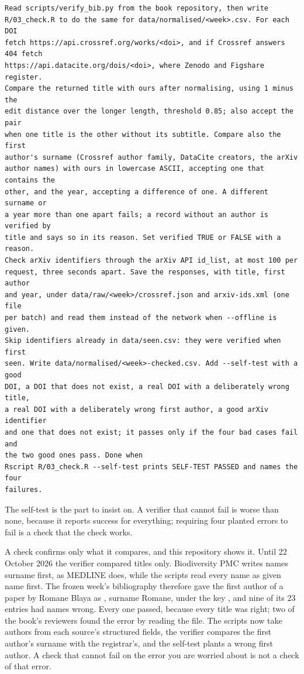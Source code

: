 \begin{lstlisting}[caption={The third prompt}]
Read scripts/verify_bib.py from the book repository, then write
R/03_check.R to do the same for data/normalised/<week>.csv. For each DOI
fetch https://api.crossref.org/works/<doi>, and if Crossref answers 404 fetch
https://api.datacite.org/dois/<doi>, where Zenodo and Figshare register.
Compare the returned title with ours after normalising, using 1 minus the
edit distance over the longer length, threshold 0.85; also accept the pair
when one title is the other without its subtitle. Compare also the first
author's surname (Crossref author family, DataCite creators, the arXiv
author names) with ours in lowercase ASCII, accepting one that contains the
other, and the year, accepting a difference of one. A different surname or
a year more than one apart fails; a record without an author is verified by
title and says so in its reason. Set verified TRUE or FALSE with a reason.
Check arXiv identifiers through the arXiv API id_list, at most 100 per
request, three seconds apart. Save the responses, with title, first author
and year, under data/raw/<week>/crossref.json and arxiv-ids.xml (one file
per batch) and read them instead of the network when --offline is given.
Skip identifiers already in data/seen.csv: they were verified when first
seen. Write data/normalised/<week>-checked.csv. Add --self-test with a good
DOI, a DOI that does not exist, a real DOI with a deliberately wrong title,
a real DOI with a deliberately wrong first author, a good arXiv identifier
and one that does not exist; it passes only if the four bad cases fail and
the two good ones pass. Done when
Rscript R/03_check.R --self-test prints SELF-TEST PASSED and names the four
failures.
\end{lstlisting}

The self-test is the part to insist on. A verifier that cannot fail is worse
than none, because it reports success for everything; requiring four planted
errors to fail is a check that the check works.

A check confirms only what it compares, and this repository shows it. Until
22 October 2026 the verifier compared titles only. Biodiversity PMC writes
names surname first, as MEDLINE does, while the scripts read every name as
given name first. The frozen week's bibliography therefore gave the first
author of a paper by Romane Blaya as , surname Romane,
under the key , and nine of its 23 entries had names
wrong. Every one passed, because every title was right; two of the book's
reviewers found the error by reading the file. The scripts now take authors
from each source's structured fields, the verifier compares the first
author's surname with the registrar's, and the self-test plants a wrong first
author. A check that cannot fail on the error you are worried about is not a
check of that error.

